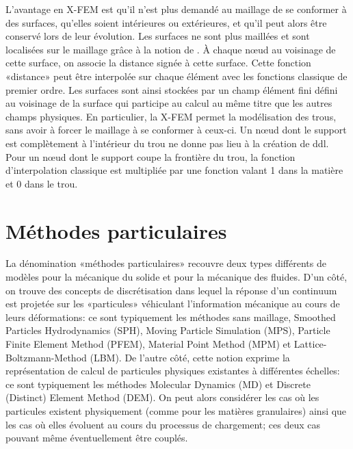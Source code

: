 \medskip
L'avantage en X-FEM est qu'il n'est plus demandé au maillage de se conformer à des surfaces, qu'elles soient intérieures ou extérieures, et qu'il peut alors être conservé lors de leur évolution. Les surfaces ne sont plus maillées et sont localisées sur le maillage grâce à la notion de . À chaque nœud au voisinage de cette surface, on associe la distance signée à cette surface. Cette fonction «distance» peut être interpolée sur chaque élément avec les fonctions classique de premier ordre. Les surfaces sont ainsi stockées par un champ élément fini défini au voisinage de la surface qui participe au calcul au même titre que les autres champs physiques. En particulier, la X-FEM permet la modélisation des trous, sans avoir à forcer le maillage à se conformer à ceux-ci. Un nœud dont le support est complètement à l'intérieur du trou ne donne pas lieu à la création de ddl. Pour un nœud dont le support coupe la frontière du trou, la fonction d'interpolation classique est multipliée par une fonction valant 1 dans la matière et 0 dans le trou.

\medskip
\section{Méthodes particulaires}\label{Sec-PBM}
La dénomination «méthodes particulaires» recouvre deux types différents de modèles pour la mécanique du solide et pour la mécanique des fluides. D'un côté, on trouve des concepts de discrétisation dans lequel la réponse d'un continuum est projetée sur les «particules» véhiculant l'information mécanique au cours de leurs déformations: ce sont typiquement les méthodes sans maillage, Smoothed Particles Hydrodynamics (SPH), Moving Particle Simulation (MPS), Particle Finite Element Method (PFEM), Material Point Method (MPM) et Lattice-Boltzmann-Method (LBM). De l'autre côté, cette notion exprime la représentation de calcul de particules physiques existantes à différentes échelles: ce sont typiquement les méthodes Molecular Dynamics (MD) et Discrete (Distinct) Element Method (DEM). On peut alors considérer les cas où les particules existent physiquement (comme pour les matières granulaires) ainsi que les cas où elles évoluent au cours du processus de chargement; ces deux cas pouvant même éventuellement être couplés.

